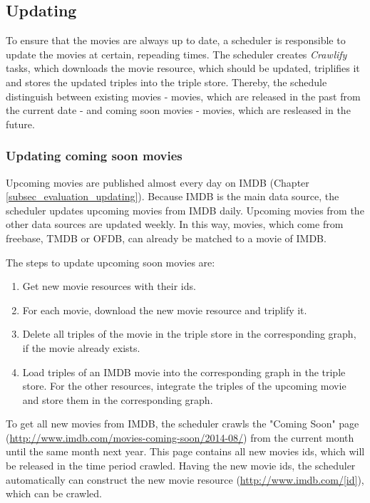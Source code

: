 \subsection{Updating}
\label{subsec_method_updating}

To ensure that the movies are always up to date, a scheduler is responsible to update the movies at certain, repeading times.
The scheduler creates \textit{Crawlify} tasks, which downloads the movie resource, which should be updated, triplifies it and stores the updated triples into the triple store.
Thereby, the schedule distinguish between existing movies - movies, which are released in the past from the current date - and coming soon movies - movies, which are resleased in the future.

\subsubsection{Updating coming soon movies}
Upcoming movies are published almost every day on IMDB (Chapter \ref{subsec_evaluation_updating}).
Because IMDB is the main data source, the scheduler updates upcoming movies from IMDB daily.
Upcoming movies from the other data sources are updated weekly.
In this way, movies, which come from freebase, TMDB or OFDB, can already be matched to a movie of IMDB.

The steps to update upcoming soon movies are:
\begin {enumerate}
	\item Get new movie resources with their ids.
	\item For each movie, download the new movie resource and triplify it.
	\item Delete all triples of the movie in the triple store in the corresponding graph, if the movie already exists.
	\item Load triples of an IMDB movie into the corresponding graph in the triple store. For the other resources, integrate the triples of the upcoming movie and store them in the corresponding graph.
\end{enumerate}

To get all new movies from IMDB, the scheduler crawls the "Coming Soon" page (\url{http://www.imdb.com/movies-coming-soon/2014-08/}) from the current month until the same month next year.
This page contains all new movies ids, which will be released in the time period crawled.
Having the new movie ids, the scheduler automatically can construct the new movie resource (\url{http://www.imdb.com/[id]}), which can be crawled.

